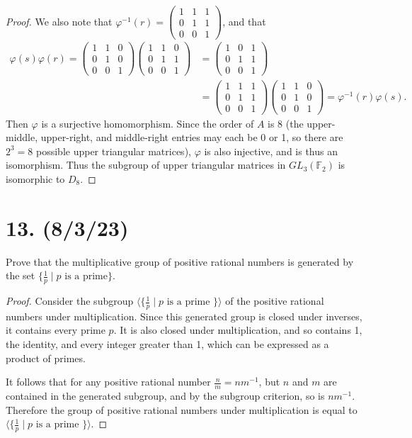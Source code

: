 \documentclass{article}
\begin{document}
\begin{proof}
    We also note that $\varphi^{-1}(r) = \begin{pmatrix}1 & 1 & 1 \\ 0 & 1 & 1 \\ 0 & 0 & 1\end{pmatrix}$, and that
    \begin{align*}
        \varphi(s)\varphi(r) = \begin{pmatrix}1 & 1 & 0 \\ 0 & 1 & 0 \\ 0 & 0 & 1\end{pmatrix}\begin{pmatrix}1 & 1 & 0 \\ 0 & 1 & 1 \\ 0 & 0 & 1\end{pmatrix} &= \begin{pmatrix}1 & 0 & 1 \\ 0 & 1 & 1 \\ 0 & 0 & 1\end{pmatrix} \\ &= \begin{pmatrix}1 & 1 & 1 \\ 0 & 1 & 1 \\ 0 & 0 & 1\end{pmatrix}\begin{pmatrix}1 & 1 & 0 \\ 0 & 1 & 0 \\ 0 & 0 & 1\end{pmatrix} = \varphi^{-1}(r)\varphi(s).
    \end{align*}
    Then $\varphi$ is a surjective homomorphism. Since the order of $A$ is 8 (the upper-middle, upper-right, and middle-right entries may each be 0 or 1, so there are $2^3 = 8$ possible upper triangular matrices), $\varphi$ is also injective, and is thus an isomorphism. Thus the subgroup of upper triangular matrices in $GL_3(\mathbb{F}_2)$ is isomorphic to $D_8$.
\end{proof}

\section*{13. (8/3/23)}

Prove that the multiplicative group of positive rational numbers is generated by the set $\{ \frac{1}{p} \mid p \text{ is a prime} \}$.

\begin{proof}
    Consider the subgroup $\langle \{ \frac{1}{p} \mid p \text{ is a prime } \} \rangle$ of the positive rational numbers under multiplication. Since this generated group is closed under inverses, it contains every prime $p$. It is also closed under multiplication, and so contains 1, the identity, and every integer greater than 1, which can be expressed as a product of primes.
    
    It follows that for any positive rational number $\frac{n}{m} = nm^{-1}$, but $n$ and $m$ are contained in the generated subgroup, and by the subgroup criterion, so is $nm^{-1}$. Therefore the group of positive rational numbers under multiplication is equal to $\langle \{ \frac{1}{p} \mid p \text{ is a prime } \} \rangle$.
\end{proof}
\end{document}
